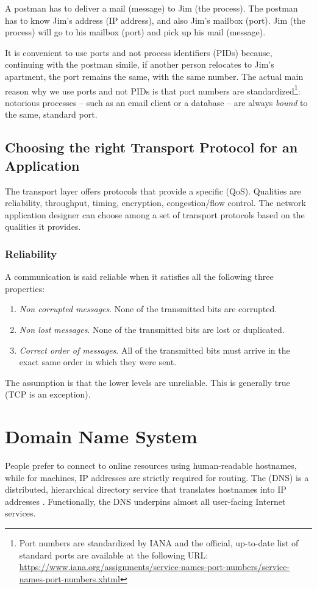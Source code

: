 A postman has to deliver a mail (message) to Jim (the process). The postman has to know Jim's address (IP address), and also Jim's mailbox (port). Jim (the process) will go to his mailbox (port) and pick up his mail (message).

It is convenient to use ports and not process identifiers (PIDs) because, continuing with the postman simile, if another person relocates to Jim's apartment, the port remains the same, with the same number.
The actual main reason why we use ports and not PIDs is that port numbers are standardized\footnote{Port numbers are standardized by IANA and the official, up-to-date list of standard ports are available at the following URL: \url{https://www.iana.org/assignments/service-names-port-numbers/service-names-port-numbers.xhtml}}: notorious processes -- such as an email client or a database -- are always \emph{bound} to the same, standard port. 

\subsection{Choosing the right Transport Protocol for an Application}
The transport layer offers protocols that provide a specific  (QoS). Qualities are reliability, throughput, timing, encryption, congestion/flow control.
The network application designer can choose among a set of transport protocols based on the qualities it provides.

\subsubsection{Reliability}
A communication is said reliable when it satisfies all the following three properties:
\begin{enumerate}
    \item \emph{Non corrupted messages}. None of the transmitted bits are corrupted.
    \item \emph{Non lost messages}. None of the transmitted bits are lost or duplicated.
    \item \emph{Correct order of messages}. All of the transmitted bits must arrive in the exact same order in which they were sent.
\end{enumerate}

The assumption is that the lower levels are unreliable. This is generally true (TCP is an exception).

\section{Domain Name System}
People prefer to connect to online resources using human-readable hostnames, while for machines, IP addresses are strictly required for routing. The  (DNS) is a distributed, hierarchical directory service that translates hostnames into IP addresses \cite{rfc1034}. Functionally, the DNS underpins almost all user-facing Internet services.

